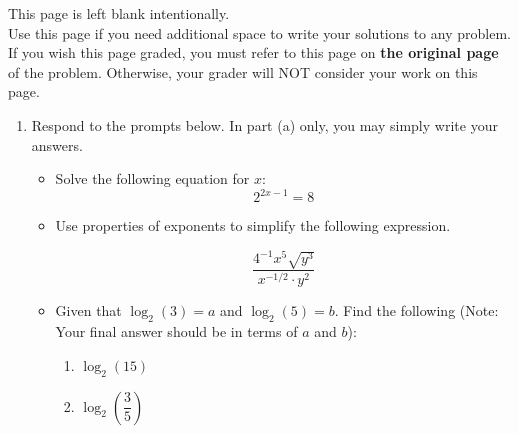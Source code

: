 \documentclass[11pt]{article}
\begin{document}
\vfill


\newpage

This page is left blank intentionally.\\

Use this page if you need additional space to write your solutions to any problem. \\

If you wish this page graded, you must refer to this page on \textbf{the original page} of the problem. Otherwise, your grader will NOT consider your work on this page.

\newpage%


\begin{enumerate}


\item Respond to the prompts below. In part (a) only, you may simply write your answers.
\begin{itemize}
\item[(a)] Solve the following equation for $x$:
$$2^{2x - 1} = 8$$
\vspace{4cm}


\item[(b)] Use properties of exponents to simplify the following expression. 

\[
\frac{4^{-1}x^5\sqrt{y^3}}{x^{-1/2} \cdot y^2}
\]
\vspace{4cm}

\item[(c)] Given that $\log_2(3) = a$ and $\log_2(5) = b.$ Find the following (Note: Your final answer should be in terms of $a$ and $b$):
\begin{enumerate}
\item $\log_2(15)$\\
\vspace{4cm}

\item $\log_2\left(\dfrac{3}{5}\right)$\\

\end{enumerate}

\end{itemize}




\end{enumerate}
\end{document}
